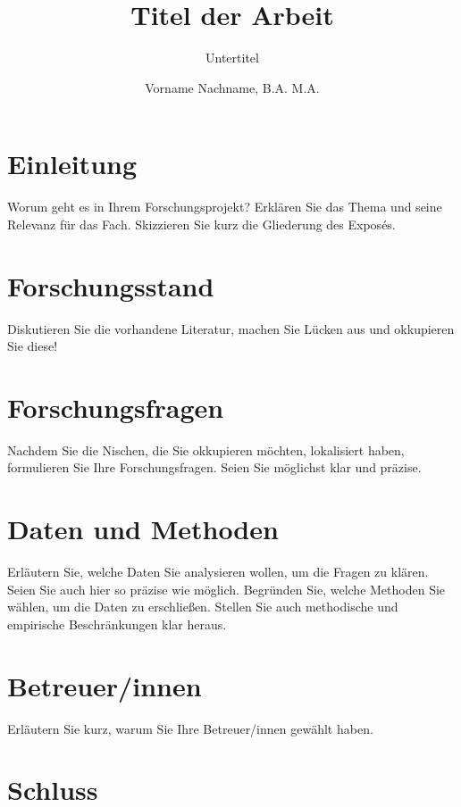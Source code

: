 \documentclass[naustrian]{univie-ling-expose}
\author{Vorname Nachname, B.A. M.A.}
\title{Titel der Arbeit}
\subtitle{Untertitel}
\begin{document}
\maketitle

\tableofcontents

\section{Einleitung}\label{sec:einleitung}

Worum geht es in Ihrem Forschungsprojekt? Erklären Sie das Thema und seine Relevanz für das Fach.
Skizzieren Sie kurz die Gliederung des Exposés.


\section{Forschungsstand}\label{sec:forschungsstand}

Diskutieren Sie die vorhandene Literatur, machen Sie Lücken aus und okkupieren Sie diese!


\section{Forschungsfragen}\label{sec:forschungsfragen}

Nachdem Sie die Nischen, die Sie okkupieren möchten, lokalisiert haben, formulieren Sie Ihre Forschungsfragen.
Seien Sie möglichst klar und präzise. 


\section{Daten und Methoden}\label{sec:daten}

Erläutern Sie, welche Daten Sie analysieren wollen, um die Fragen zu klären. Seien Sie auch hier so präzise wie möglich.
Begründen Sie, welche Methoden Sie wählen, um die Daten zu erschließen. Stellen Sie auch methodische und empirische
Beschränkungen klar heraus.


\section{Betreuer/innen}\label{sec:betreuer}

Erläutern Sie kurz, warum Sie Ihre Betreuer/innen gewählt haben. 


\section{Schluss}\label{sec:schluss}
\end{document}
